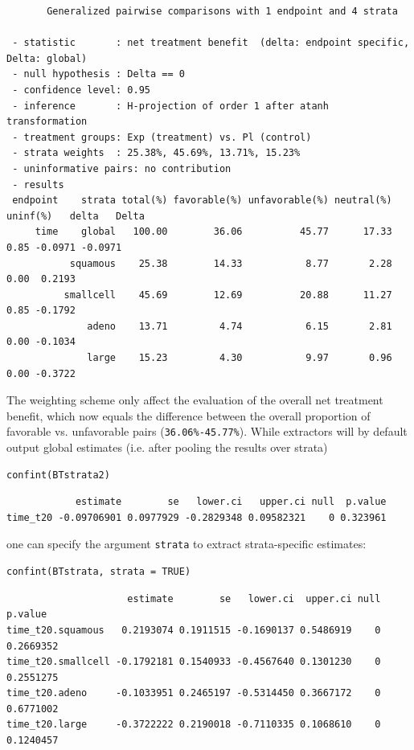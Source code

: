 \documentclass[12pt]{article}
\begin{document}
\begin{verbatim}
       Generalized pairwise comparisons with 1 endpoint and 4 strata

 - statistic       : net treatment benefit  (delta: endpoint specific, Delta: global) 
 - null hypothesis : Delta == 0 
 - confidence level: 0.95 
 - inference       : H-projection of order 1 after atanh transformation 
 - treatment groups: Exp (treatment) vs. Pl (control) 
 - strata weights  : 25.38%, 45.69%, 13.71%, 15.23% 
 - uninformative pairs: no contribution
 - results
 endpoint    strata total(%) favorable(%) unfavorable(%) neutral(%) uninf(%)   delta   Delta
     time    global   100.00        36.06          45.77      17.33     0.85 -0.0971 -0.0971
           squamous    25.38        14.33           8.77       2.28     0.00  0.2193        
          smallcell    45.69        12.69          20.88      11.27     0.85 -0.1792        
              adeno    13.71         4.74           6.15       2.81     0.00 -0.1034        
              large    15.23         4.30           9.97       0.96     0.00 -0.3722
\end{verbatim}

The weighting scheme only affect the evaluation of the overall net
treatment benefit, which now equals the difference between the overall
proportion of favorable vs. unfavorable pairs (\texttt{36.06\%-45.77\%}). While
extractors will by default output global estimates (i.e. after pooling
the results over strata)
\lstset{language=r,label= ,caption= ,captionpos=b,numbers=none}
\begin{lstlisting}
confint(BTstrata2)
\end{lstlisting}

\begin{verbatim}
            estimate        se   lower.ci   upper.ci null  p.value
time_t20 -0.09706901 0.0977929 -0.2829348 0.09582321    0 0.323961
\end{verbatim}


one can specify the argument \texttt{strata} to extract strata-specific estimates:
\lstset{language=r,label= ,caption= ,captionpos=b,numbers=none}
\begin{lstlisting}
confint(BTstrata, strata = TRUE)
\end{lstlisting}

\begin{verbatim}
                     estimate        se   lower.ci  upper.ci null   p.value
time_t20.squamous   0.2193074 0.1911515 -0.1690137 0.5486919    0 0.2669352
time_t20.smallcell -0.1792181 0.1540933 -0.4567640 0.1301230    0 0.2551275
time_t20.adeno     -0.1033951 0.2465197 -0.5314450 0.3667172    0 0.6771002
time_t20.large     -0.3722222 0.2190018 -0.7110335 0.1068610    0 0.1240457
\end{verbatim}
\end{document}

